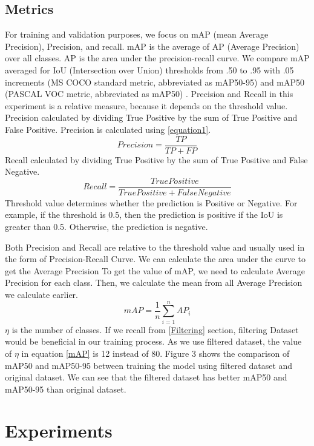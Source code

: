 \documentclass[conference]{IEEEtran}
\begin{document}
\subsection{Metrics}
For training and validation purposes, we focus on mAP (mean Average Precision), Precision, and recall. mAP is the average of AP (Average Precision) over all classes. AP is the area under the precision-recall curve.
We compare mAP averaged for IoU (Intersection over Union) thresholds from .50 to .95 with .05 increments (MS COCO standard metric, abbreviated as mAP50-95) and mAP50 (PASCAL VOC metric, abbreviated as mAP50) \cite{b7}. 
Precision and Recall in  this experiment is a relative measure, because it depends on the threshold value.
Precision calculated by dividing True Positive by the sum of True Positive and False Positive. 
Precision is calculated using \eqref{equation1}.
\begin{equation}
Precision = \frac{TP}{TP+FP}
\label{equation1}
\end{equation}
Recall calculated by dividing True Positive by the sum of True Positive and False Negative.
\begin{equation}
Recall = \frac{True Positive}{TruePositive+FalseNegative}
\end{equation}
Threshold value determines whether the prediction is Positive or Negative. For example, if the threshold is 0.5, then the prediction is positive if the IoU is greater than 0.5. Otherwise, the prediction is negative.

Both Precision and Recall are relative to the threshold value and usually used in the form of Precision-Recall Curve. We can calculate the area under the curve to get the Average Precision
To get the value of mAP, we need to calculate Average Precision for each class. Then, we calculate the mean from all Average Precision we calculate earlier.
\begin{equation}
mAP = \frac{1}{n}\sum_{i=1}^{n}AP_i
\label{mAP}
\end{equation}
$\eta$ is the number of classes.
If we recall from \ref{Filtering} section, filtering Dataset would be beneficial in our training process. As we use filtered dataset, the value of $\eta$ in equation \ref{mAP} is 12 instead of 80.
Figure 3 shows the comparison of mAP50 and mAP50-95 between training the model using filtered dataset and original dataset. We can see that the filtered dataset has better mAP50 and mAP50-95 than original dataset.

\section{Experiments}
\end{document}
